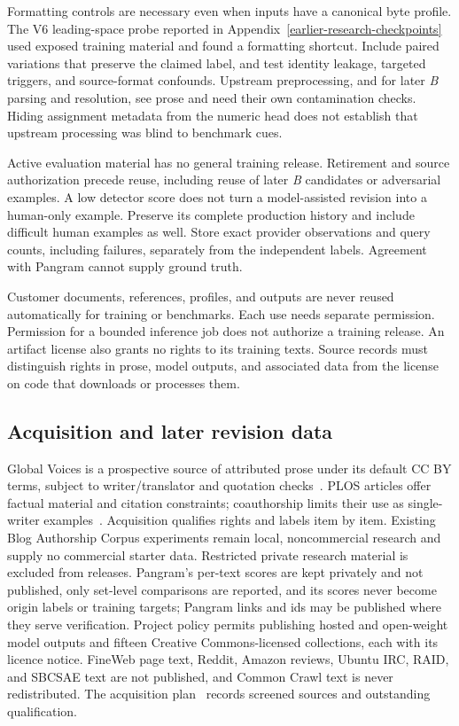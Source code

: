 Formatting controls are necessary even when inputs have a canonical byte
profile. The V6 leading-space probe reported in
Appendix~\ref{earlier-research-checkpoints} used exposed training
material and found a formatting shortcut. Include paired variations that preserve
the claimed label, and test identity leakage, targeted triggers, and
source-format confounds. Upstream preprocessing, and for later \textit{B}
parsing and resolution, see prose and need their own contamination checks. Hiding assignment metadata from the numeric
head does not establish that upstream processing was blind to benchmark cues.

Active evaluation material has no general training release. Retirement and
source authorization precede reuse, including reuse of later \textit{B}
candidates or adversarial examples. A low detector score does not turn a
model-assisted revision into a human-only example. Preserve its complete
production history and include difficult human examples as well. Store exact
provider observations and query counts, including failures, separately from
the independent labels. Agreement with Pangram cannot supply ground truth.

Customer documents, references, profiles, and outputs are never reused
automatically for training or benchmarks. Each use needs separate permission.
Permission for a bounded inference job does not authorize a training release.
An artifact license also grants no rights to its training texts. Source records
must distinguish rights in prose, model outputs, and associated data from the
license on code that downloads or processes them.

\subsection{Acquisition and later revision data}\label{acquisition-and-later-revision-data}

Global Voices is a prospective source of attributed prose under its default
CC BY terms, subject to writer/translator and quotation checks~\cite{globalvoices}.
PLOS articles offer factual material and citation constraints; coauthorship
limits their use as single-writer examples~\cite{plos}. Acquisition qualifies
rights and labels item by item. Existing Blog Authorship Corpus experiments
remain local, noncommercial research and supply no commercial starter data.
Restricted private research material is excluded from releases. Pangram's
per-text scores are kept privately and not published, only set-level
comparisons are reported, and its scores never become origin labels or training
targets; Pangram links and ids may be published where they serve verification. Project policy permits publishing hosted and open-weight model
outputs and fifteen Creative Commons-licensed collections, each with its
licence notice. FineWeb page text, Reddit, Amazon
reviews, Ubuntu IRC, RAID, and SBCSAE text are not published, and Common Crawl
text is never redistributed. The acquisition plan~\cite{trainingplan} records
screened sources and outstanding qualification.

